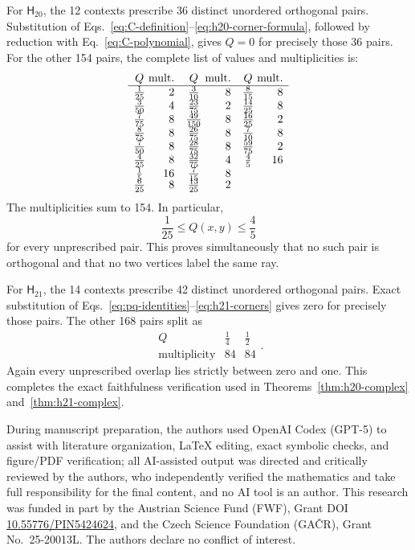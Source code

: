 \documentclass[twocolumn,aps,pra,floatfix,amsmath,amssymb,longbibliography]{revtex4-2}
\theoremstyle{definition}
\theoremstyle{remark}
\newcommand{\Htwenty}{\mathsf H_{20}}
\newcommand{\Htwentyone}{\mathsf H_{21}}
\begin{document}
For $\Htwenty$, the 12 contexts prescribe 36 distinct unordered
orthogonal pairs.  Substitution of
Eqs.~\eqref{eq:C-definition}--\eqref{eq:h20-corner-formula}, followed by
reduction with Eq.~\eqref{eq:C-polynomial}, gives $Q=0$ for precisely
those 36 pairs.  For the other 154 pairs, the complete list of values
and multiplicities is:
\begin{equation}
\begin{array}{c@{\;}r@{\quad}c@{\;}r@{\quad}c@{\;}r}
 Q&\text{mult.}&Q&\text{mult.}&Q&\text{mult.}\\ \hline
 \frac1{25}&2&\frac3{10}&8&\frac8{15}&8\\
 \frac3{50}&4&\frac{23}{75}&2&\frac{14}{25}&8\\
 \frac7{75}&8&\frac{49}{150}&8&\frac{16}{25}&2\\
 \frac8{75}&8&\frac{26}{75}&8&\frac7{10}&8\\
 \frac7{50}&8&\frac{28}{75}&8&\frac{59}{75}&2\\
 \frac4{25}&8&\frac{32}{75}&4&\frac45&16\\
 \frac15&16&\frac7{15}&8&&\\[-2pt]
 \frac6{25}&8&\frac{13}{25}&2&&
\end{array}
\label{eq:H20-Q-table}
\end{equation}
The multiplicities sum to 154.  In particular,
\begin{equation}
 \frac1{25}\le Q(x,y)\le\frac45
 \label{eq:H20-Q-bounds}
\end{equation}
for every unprescribed pair.  This proves simultaneously that no such
pair is orthogonal and that no two vertices label the same ray.

For $\Htwentyone$, the 14 contexts prescribe 42 distinct unordered
orthogonal pairs.  Exact substitution of
Eqs.~\eqref{eq:pq-identities}--\eqref{eq:h21-corners} gives zero for
precisely those pairs.  The other 168 pairs split as
\begin{equation}
 \begin{array}{c|cc}
 Q&\frac14&\frac12\\ \hline
 \text{multiplicity}&84&84
 \end{array}.
 \label{eq:H21-Q-table}
\end{equation}
Again every unprescribed overlap lies strictly between zero and one.
This completes the exact faithfulness verification used in
Theorems~\ref{thm:h20-complex} and~\ref{thm:h21-complex}.

\begin{acknowledgments}
During manuscript preparation, the authors used OpenAI Codex (GPT-5) to assist with literature organization, LaTeX editing, exact symbolic checks, and figure/PDF verification; all AI-assisted output was directed and critically reviewed by the authors, who independently verified the mathematics and take full responsibility for the final content, and no AI tool is an author.
This research was funded in part by the Austrian
Science Fund (FWF), Grant DOI \href{https://doi.org/10.55776/PIN5424624}{10.55776/PIN5424624}, and the Czech Science
Foundation (GA\v{C}R), Grant No.~25-20013L.  The authors declare no
conflict of interest.
\end{acknowledgments}


\end{document}
